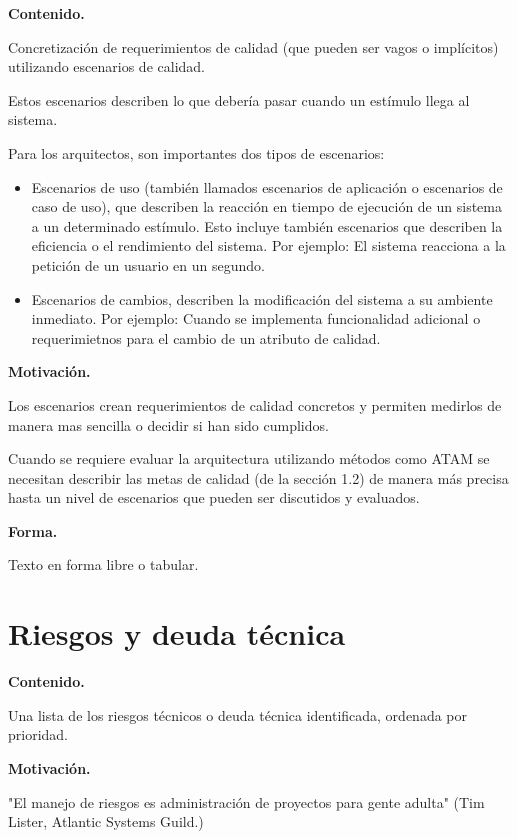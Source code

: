 \documentclass[]{article}
\begin{document}
\textbf{Contenido.}

Concretización de requerimientos de calidad (que pueden ser vagos o
implícitos) utilizando escenarios de calidad.

Estos escenarios describen lo que debería pasar cuando un estímulo llega
al sistema.

Para los arquitectos, son importantes dos tipos de escenarios:

\begin{itemize}
\item
  Escenarios de uso (también llamados escenarios de aplicación o
  escenarios de caso de uso), que describen la reacción en tiempo de
  ejecución de un sistema a un determinado estímulo. Esto incluye
  también escenarios que describen la eficiencia o el rendimiento del
  sistema. Por ejemplo: El sistema reacciona a la petición de un usuario
  en un segundo.
\item
  Escenarios de cambios, describen la modificación del sistema a su
  ambiente inmediato. Por ejemplo: Cuando se implementa funcionalidad
  adicional o requerimietnos para el cambio de un atributo de calidad.
\end{itemize}

\textbf{Motivación.}

Los escenarios crean requerimientos de calidad concretos y permiten
medirlos de manera mas sencilla o decidir si han sido cumplidos.

Cuando se requiere evaluar la arquitectura utilizando métodos como ATAM
se necesitan describir las metas de calidad (de la sección 1.2) de
manera más precisa hasta un nivel de escenarios que pueden ser
discutidos y evaluados.

\textbf{Forma.}

Texto en forma libre o tabular.

\hypertarget{section-technical-risks}{%
\section{Riesgos y deuda técnica}\label{section-technical-risks}}

\textbf{Contenido.}

Una lista de los riesgos técnicos o deuda técnica identificada, ordenada
por prioridad.

\textbf{Motivación.}

"El manejo de riesgos es administración de proyectos para gente adulta"
(Tim Lister, Atlantic Systems Guild.)
\end{document}

